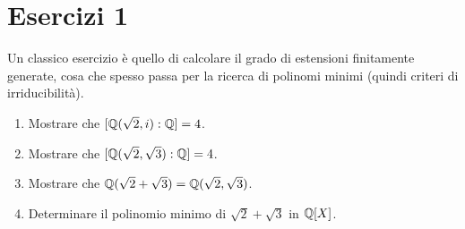 
\section{Esercizi 1}

Un classico esercizio è quello di calcolare il grado di estensioni finitamente generate, cosa che spesso passa per la ricerca di polinomi minimi (quindi criteri di irriducibilità).

\begin{eser}
\begin{enumerate}
\item Mostrare che \([\mathbb{Q}(\sqrt{2},i):\mathbb{Q}]=4\).
\item Mostrare che \([\mathbb{Q}(\sqrt{2},\sqrt{3}):\mathbb{Q}]=4\).
\item Mostrare che \(\mathbb{Q}(\sqrt{2}+\sqrt{3})=\mathbb{Q}(\sqrt{2},\sqrt{3})\).
\item Determinare il polinomio minimo di \(\sqrt{2}+\sqrt{3}\) in \(\mathbb{Q}[X]\).
\end{enumerate}
\end{eser}

